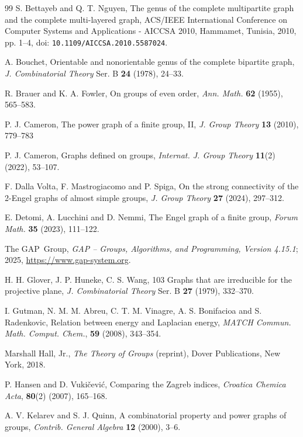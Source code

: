 \documentclass[reqno,12pt]{amsart}
\theoremstyle{plain}
\theoremstyle{definition}
\begin{document}
{\begin{thebibliography}{99}
S. Bettayeb and Q. T. Nguyen,
The genus of the complete multipartite graph and the complete multi-layered graph,
ACS/IEEE International Conference on Computer Systems and Applications - AICCSA 2010, Hammamet, Tunisia, 2010, pp. 1--4,
doi: \texttt{10.1109/AICCSA.2010.5587024}.

A. Bouchet,
Orientable and nonorientable genus of the complete bipartite graph,
\textit{J. Combinatorial Theory} Ser. B \textbf{24} (1978), 24--33.

R. Brauer and K. A. Fowler,
On groups of even order,
\textit{Ann. Math.} \textbf{62} (1955), 565--583.

P. J. Cameron,
The power graph of a finite group, II,
\textit{J. Group Theory} \textbf{13} (2010), 779--783

P. J. Cameron,  Graphs defined on groups,
\textit{Internat.  J.  Group Theory} \textbf{11}(2) (2022), 53--107.

F. Dalla Volta, F. Mastrogiacomo and P. Spiga,
On the strong connectivity of the 2-Engel graphs of almost simple groups,
\textit{J. Group Theory} \textbf{27} (2024), 297--312.

E. Detomi, A. Lucchini and D. Nemmi,
The Engel graph of a finite group,
\textit{Forum Math.} \textbf{35} (2023), 111--122.

  The GAP~Group, \emph{GAP -- Groups, Algorithms, and Programming, 
  Version 4.15.1}; 
  2025,
  \url{https://www.gap-system.org}.

H. H. Glover, J. P. Huneke, C. S. Wang,
103 Graphs that are irreducible for the projective plane,
\textit{J. Combinatorial Theory} Ser. B \textbf{27} (1979), 332--370.

I. Gutman,   N. M. M. Abreu,  C. T. M. Vinagre,  A. S. Bonifacioa and  S. Radenkovic,
Relation between energy and Laplacian energy,
\textit{MATCH Commun. Math. Comput. Chem.}, \textbf{59} (2008), 343--354.

Marshall Hall, Jr.,
\textit{The Theory of Groups} (reprint),
Dover Publications, New York, 2018.

P. Hansen and D. Vuki{\v{c}}evi{\'c},
Comparing the Zagreb indices,
\textit{Croatica Chemica Acta}, \textbf{80}(2) (2007), 165--168. 

A. V. Kelarev and S. J. Quinn,
A combinatorial property and power graphs of groups,
\textit{Contrib. General Algebra} \textbf{12} (2000), 3--6. 


\end{thebibliography}}
\end{document}

